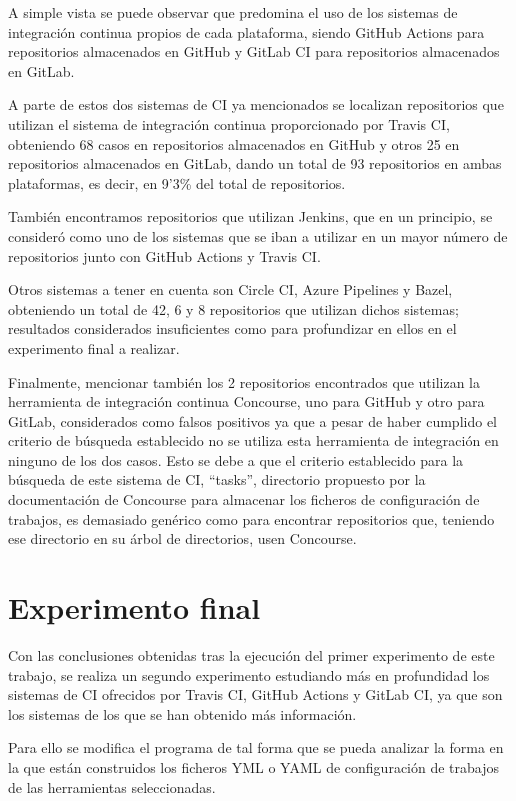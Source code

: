 A simple vista se puede observar que predomina el uso de los sistemas de integración continua propios de cada plataforma, siendo GitHub Actions para repositorios almacenados en GitHub y GitLab CI para repositorios almacenados en GitLab.

A parte de estos dos sistemas de CI ya mencionados se localizan repositorios que utilizan el sistema de integración continua proporcionado por Travis CI, obteniendo 68 casos en repositorios almacenados en GitHub y otros 25 en repositorios almacenados en GitLab, dando un total de 93 repositorios en ambas plataformas, es decir, en 9'3\% del total de repositorios.

También encontramos repositorios que utilizan Jenkins, que en un principio, se consideró como uno de los sistemas que se iban a utilizar en un mayor número de repositorios junto con GitHub Actions y Travis CI.

Otros sistemas a tener en cuenta son Circle CI, Azure Pipelines y Bazel, obteniendo un total de 42, 6 y 8 repositorios que utilizan dichos sistemas; resultados considerados insuficientes como para profundizar en ellos en el experimento final a realizar.

Finalmente, mencionar también los 2 repositorios encontrados que utilizan la herramienta de integración continua Concourse, uno para GitHub y otro para GitLab, considerados como falsos positivos ya que a pesar de haber cumplido el criterio de búsqueda establecido no se utiliza esta herramienta de integración en ninguno de los dos casos. Esto se debe a que el criterio establecido para la búsqueda de este sistema de CI, ``tasks'', directorio propuesto por la documentación de Concourse para almacenar los ficheros de configuración de trabajos, es demasiado genérico como para encontrar repositorios que, teniendo ese directorio en su árbol de directorios, usen Concourse.

\section{Experimento final}
Con las conclusiones obtenidas tras la ejecución del primer experimento de este trabajo, se realiza un segundo experimento estudiando más en profundidad los sistemas de CI ofrecidos por Travis CI, GitHub Actions y GitLab CI, ya que son los sistemas de los que se han obtenido más información.

Para ello se modifica el programa de tal forma que se pueda analizar la forma en la que están construidos los ficheros YML o YAML de configuración de trabajos de las herramientas seleccionadas.


